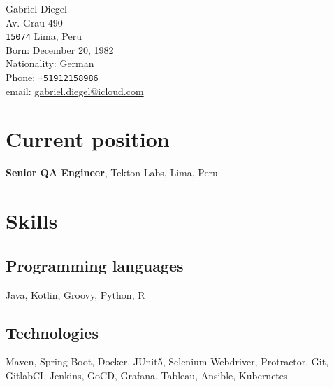 \documentclass[10pt, a4paper]{article}
\begin{document}
{\LARGE Gabriel Diegel}\\[1cm]
Av. Grau 490\\
\texttt{15074} Lima, Peru\\[.2cm]
Born:  December 20, 1982\\
Nationality:  German\\[.2cm]
Phone: \texttt{+51912158986}\\
email: \href{mailto:gabriel.diegel@icloud.com}{gabriel.diegel@icloud.com}\\

\section*{Current position}
{\bf Senior QA Engineer}, Tekton Labs, Lima, Peru

\section*{Skills}
\subsection*{Programming languages}
Java, Kotlin, Groovy, Python, R
\subsection*{Technologies}
Maven, Spring Boot, Docker, JUnit5, Selenium Webdriver, Protractor, Git, GitlabCI, Jenkins, GoCD, Grafana, Tableau, Ansible, Kubernetes

\end{document}
